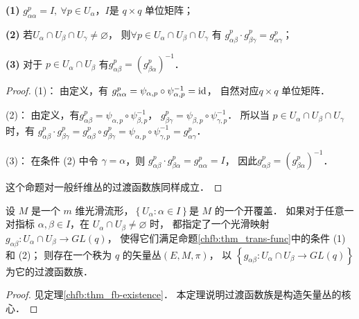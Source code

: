 \begin{proposition}\label{chfb:thm_trans-func}
{\bfseries (1)} $g_{\alpha \alpha}^p=I,\ \forall p \in U_\alpha$，$I$是 $q \times q$ 单位矩阵；

{\bfseries (2)} 若$U_\alpha \cap U_\beta \cap U_\gamma \neq \varnothing$，
则$\forall p \in U_\alpha \cap U_\beta \cap U_\gamma$ 有
$g_{\alpha \beta}^p \cdot g_{\beta \gamma}^p=g_{\alpha \gamma}^p $；

{\bfseries (3)} 对于 $p \in U_\alpha \cap U_\beta$ 有$g_{\alpha \beta}^p=(g_{\beta \alpha}^p)^{-1} $．
\end{proposition}

\begin{proof}
    (1)： 由定义，有
    $ g_{\alpha \alpha}^p=\psi_{\alpha, p} \circ \psi_{\alpha, p}^{-1} = {\rm id}    $，
    自然对应$q \times q$ 单位矩阵．
    
(2)： 由定义，有$g_{\alpha \beta}^p=\psi_{\alpha, p} \circ \psi_{\beta, p}^{-1}$，
$g_{\beta \gamma}^p=\psi_{\beta, p} \circ \psi_{\gamma, p}^{-1}$．
所以当 $p \in U_\alpha \cap U_\beta \cap U_\gamma$ 时，有
$  g_{\alpha \beta}^p \cdot g_{\beta \gamma}^p 
    =  g_{\alpha \beta}^p \circ g_{\beta \gamma}^p 
    =  \psi_{\alpha, p} \circ \psi_{\gamma, p}^{-1}=g_{\alpha \gamma}^p$．


(3)： 在条件 (2) 中令 $\gamma=\alpha$，则
$g_{\alpha \beta}^p \cdot g_{\beta \alpha}^p=g_{\alpha\alpha}^p=I$，
因此$g_{\alpha \beta}^p=\left(g_{\beta \alpha}^p\right)^{-1} $．

这个命题对一般纤维丛的过渡函数族同样成立．
\end{proof}


\begin{theorem}\label{chfb:thm_vector-existence}
设 $M$ 是一个 $m$ 维光滑流形，$\left\{U_\alpha: \alpha \in I\right\}$是 $M$ 的一个开覆盖．
如果对于任意一对指标 $\alpha, \beta \in I$，在 $U_\alpha \cap U_\beta \neq \varnothing$ 时，
都指定了一个光滑映射 $g_{\alpha \beta}: U_\alpha \cap U_\beta \rightarrow GL(q)$，
使得它们满足命题\ref{chfb:thm_trans-func}中的条件 (1)和 (2)；
则存在一个秩为 $q$ 的矢量丛$(E,M,\pi)$，
以 $\left\{g_{\alpha \beta}: U_\alpha \cap U_\beta \rightarrow GL(q)\right\}$ 为它的过渡函数族．
\end{theorem}

\begin{proof}
    见定理\ref{chfb:thm_fb-existence}．
    本定理说明过渡函数族是构造矢量丛的核心．
\end{proof}




